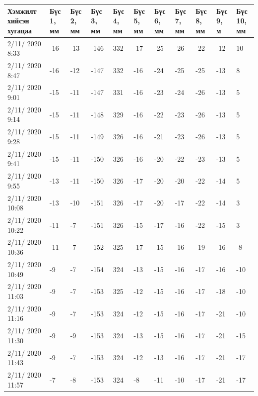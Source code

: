 \begin{table}[h]
    \centering
    \begin{tabular}{|p{1.5cm}|p{0.8cm}|p{0.8cm}|p{0.8cm}|p{0.8cm}|p{0.8cm}|p{0.8cm}|p{0.8cm}|p{0.8cm}|p{0.8cm}|p{0.8cm}|}
         \hline
     Хэмжилт хийсэн хугацаа & Бүс 1, мм&	Бүс 2, мм&	Бүс 3, мм&	Бүс 4, мм&	Бүс 5, мм&	Бүс 6, мм&	Бүс 7, мм&	Бүс 8, мм&	Бүс 9, м&	Бүс 10, мм \\ \hline
2/11/ 2020 8:33&	-16&-13&-146&332&-17&-25&-26&-22&-12&10 \\ \hline
2/11/ 2020 8:47&	-16&-12&-147&332&-16&-24&-25&-25&-13&8 \\ \hline
2/11/ 2020 9:01&	-15&-11&-147&331&-16&-23&-24&-26&-13&5 \\ \hline
2/11/ 2020 9:14&	-15&-11&-148&329&-16&-22&-23&-26&-13&5 \\ \hline
2/11/ 2020 9:28&	-15&-11&-149&326&-16&-21&-23&-26&-13&5 \\ \hline
2/11/ 2020 9:41&	-15&-11&-150&326&-16&-20&-22&-23&-13&5 \\ \hline
2/11/ 2020 9:55&	-13&-11&-150&326&-17&-20&-20&-22&-14&5 \\ \hline
2/11/ 2020 10:08&	-13&-10&-151&326&-17&-20&-17&-22&-14&3 \\ \hline
2/11/ 2020 10:22&	-11&-7&	-151&326&-15&-17&-16&-22&-15&3 \\ \hline
2/11/ 2020 10:36&	-11&-7&	-152&325&-17&-15&-16&-19&-16&-8 \\ \hline
2/11/ 2020 10:49&	-9&	-7&	-154&324&-13&-15&-16&-17&-16&-10 \\ \hline
2/11/ 2020 11:03&	-9&	-7&	-153&325&-12&-15&-16&-17&-18&-10 \\ \hline
2/11/ 2020 11:16&	-9&	-7&	-153&324&-12&-15&-16&-17&-21&-10 \\ \hline
2/11/ 2020 11:30&	-9&	-9&	-153&324&-13&-15&-16&-17&-21&-15 \\ \hline
2/11/ 2020 11:43&	-9&	-7&	-153&324&-12&-13&-16&-17&-21&-17 \\ \hline
2/11/ 2020 11:57&	-7&	-8&	-153&324&-8 &-11&-10&-17&-21&-17 \\ \hline
    \end{tabular}
\end{table}

